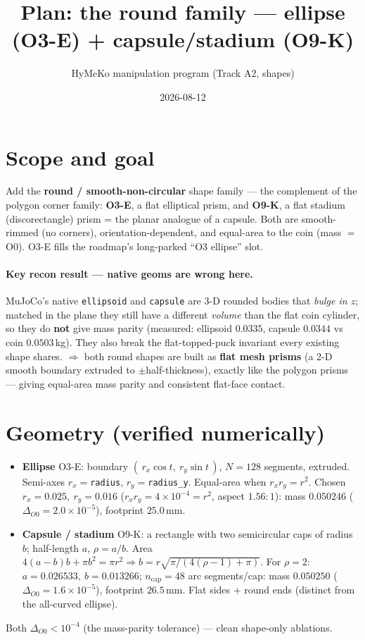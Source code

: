 \documentclass[11pt]{article}
\title{Plan: the round family --- ellipse (O3-E) + capsule/stadium (O9-K)}
\author{HyMeKo manipulation program (Track A2, shapes)}
\date{2026-08-12}
\begin{document}
\maketitle

\section{Scope and goal}
Add the \textbf{round / smooth-non-circular} shape family --- the complement of the polygon corner family:
\textbf{O3-E}, a flat elliptical prism, and \textbf{O9-K}, a flat stadium (discorectangle) prism = the
planar analogue of a capsule. Both are smooth-rimmed (no corners), orientation-dependent, and equal-area
to the coin (mass $=$ O0). O3-E fills the roadmap's long-parked ``O3 ellipse'' slot.

\paragraph{Key recon result --- native geoms are wrong here.} MuJoCo's native \texttt{ellipsoid} and
\texttt{capsule} are 3-D rounded bodies that \emph{bulge in $z$}; matched in the plane they still have a
different \emph{volume} than the flat coin cylinder, so they do \textbf{not} give mass parity
(measured: ellipsoid $0.0335$, capsule $0.0344$ vs coin $0.0503$\,kg). They also break the flat-topped-puck
invariant every existing shape shares. $\Rightarrow$ both round shapes are built as \textbf{flat mesh
prisms} (a 2-D smooth boundary extruded to $\pm$half-thickness), exactly like the polygon prisms --- giving
equal-area mass parity and consistent flat-face contact.

\section{Geometry (verified numerically)}
\begin{itemize}[nosep]
  \item \textbf{Ellipse} O3-E: boundary $(\,r_x\cos t,\ r_y\sin t\,)$, $N{=}128$ segments, extruded. Semi-axes
    $r_x{=}$\texttt{radius}, $r_y{=}$\texttt{radius\_y}. Equal-area when $r_x r_y = r^2$. Chosen
    $r_x{=}0.025,\ r_y{=}0.016$ ($r_xr_y{=}4\times10^{-4}{=}r^2$, aspect $1.56{:}1$): mass $0.050246$
    ($\Delta_{O0}{=}2.0\times10^{-5}$), footprint $25.0$\,mm.
  \item \textbf{Capsule / stadium} O9-K: a rectangle with two semicircular caps of radius $b$; half-length
    $a$, $\rho{=}a/b$. Area $4(a{-}b)b + \pi b^2 = \pi r^2 \Rightarrow b = r\sqrt{\pi/(4(\rho{-}1)+\pi)}$.
    For $\rho{=}2$: $a{=}0.026533,\ b{=}0.013266$; $n_{\text{cap}}{=}48$ arc segments/cap: mass $0.050250$
    ($\Delta_{O0}{=}1.6\times10^{-5}$), footprint $26.5$\,mm. Flat sides + round ends (distinct from the
    all-curved ellipse).
\end{itemize}
Both $\Delta_{O0} < 10^{-4}$ (the mass-parity tolerance) --- clean shape-only ablations.
\end{document}
